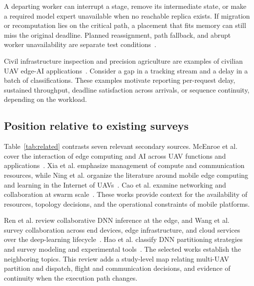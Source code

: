 \documentclass[pdflatex,sn-vancouver-num]{sn-jnl}
\begin{document}
A departing worker can interrupt a stage, remove its intermediate state, or make a required model expert unavailable when no reachable replica exists. If migration or recomputation lies on the critical path, a placement that fits memory can still miss the original deadline. Planned reassignment, path fallback, and abrupt worker unavailability are separate test conditions~\cite{R0002,R0038,R0062,R0110,R0118,R0292}.

Civil infrastructure inspection and precision agriculture are examples of civilian UAV edge-AI applications~\cite{survey_uav_edge_ai}. Consider a gap in a tracking stream and a delay in a batch of classifications. These examples motivate reporting per-request delay, sustained throughput, deadline satisfaction across arrivals, or sequence continuity, depending on the workload.

\subsection{Position relative to existing surveys}
Table~\ref{tab:related} contrasts seven relevant secondary sources. McEnroe et al. cover the interaction of edge computing and AI across UAV functions and applications~\cite{survey_uav_edge_ai}. Xia et al. emphasize management of compute and communication resources, while Ning et al. organize the literature around mobile edge computing and learning in the Internet of UAVs~\cite{survey_uav_resource,survey_iouav_mec_ml}. Cao et al. examine networking and collaboration at swarm scale~\cite{survey_uav_swarm_ci}. These works provide context for the availability of resources, topology decisions, and the operational constraints of mobile platforms.

Ren et al. review collaborative DNN inference at the edge, and Wang et al. survey collaboration across end devices, edge infrastructure, and cloud services over the deep-learning lifecycle~\cite{survey_collab_dnn,survey_end_edge_cloud}. Hao et al. classify DNN partitioning strategies and survey modeling and experimental tools~\cite{survey_hao2026}. The selected works establish the neighboring topics. This review adds a study-level map relating multi-UAV partition and dispatch, flight and communication decisions, and evidence of continuity when the execution path changes.
\end{document}
